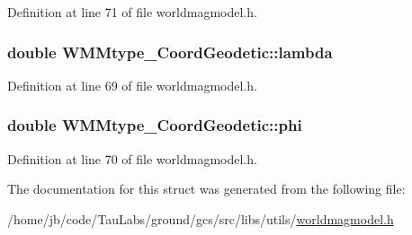 \-Definition at line 71 of file worldmagmodel.\-h.

\hypertarget{struct_w_m_mtype___coord_geodetic_ae94dc806d0564cca00a63db68e594225}{
\subsubsection[{lambda}]{\setlength{\rightskip}{0pt plus 5cm}double {\bf \-W\-M\-Mtype\-\_\-\-Coord\-Geodetic\-::lambda}}}\label{struct_w_m_mtype___coord_geodetic_ae94dc806d0564cca00a63db68e594225}


\-Definition at line 69 of file worldmagmodel.\-h.

\hypertarget{struct_w_m_mtype___coord_geodetic_afa72809b75b6c5675ffb657d6a85420a}{
\subsubsection[{phi}]{\setlength{\rightskip}{0pt plus 5cm}double {\bf \-W\-M\-Mtype\-\_\-\-Coord\-Geodetic\-::phi}}}\label{struct_w_m_mtype___coord_geodetic_afa72809b75b6c5675ffb657d6a85420a}


\-Definition at line 70 of file worldmagmodel.\-h.



\-The documentation for this struct was generated from the following file\-:\begin{DoxyCompactItemize}
\item 
/home/jb/code/\-Tau\-Labs/ground/gcs/src/libs/utils/\hyperlink{worldmagmodel_8h}{worldmagmodel.\-h}\end{DoxyCompactItemize}
